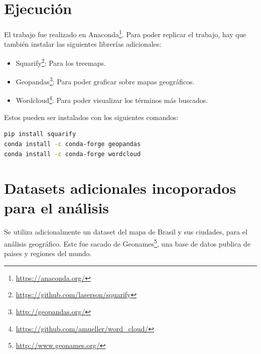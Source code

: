 \documentclass[a4paper]{article}
\begin{document}
\newpage
\appendix

\section{Ejecución}

El trabajo fue realizado en Anaconda\footnote{\url{https://anaconda.org/}}. Para poder replicar el trabajo, hay que también instalar las siguientes librerías adicionales:

\begin{itemize}
	\item{Squarify\footnote{\url{https://github.com/laserson/squarify}}: Para los treemaps.}
	\item{Geopandas\footnote{\url{http://geopandas.org/}}: Para poder graficar sobre mapas geográficos.}
	\item{Wordcloud\footnote{\url{https://github.com/amueller/word_cloud/}}: Para poder visualizar los términos más buscados.}
\end{itemize}

Estos pueden ser instalados con los siguientes comandos: 
\begin{lstlisting}[language=sh]
pip install squarify
conda install -c conda-forge geopandas
conda install -c conda-forge wordcloud
\end{lstlisting}

\section{Datasets adicionales incoporados para el análisis}

Se utiliza adicionalmente un dataset del mapa de Brasil y sus ciudades, para el análisis geográfico. Este fue sacado de  Geonames\footnote{\url{http://www.geonames.org/}}, una base de datos publica de paises y regiones del mundo.
\end{document}
